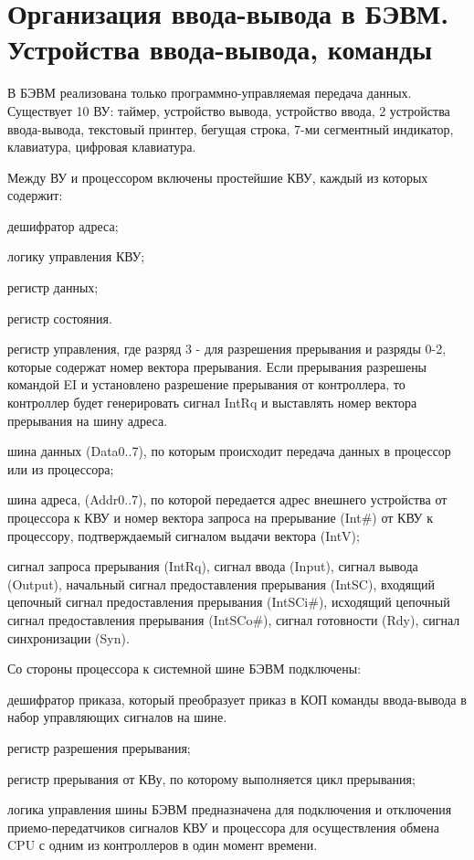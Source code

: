 \documentclass{article}
\begin{document}
\section{Организация ввода-вывода в БЭВМ. Устройства ввода-вывода, команды}
В БЭВМ реализована только программно-управляемая передача данных. 
Существует 10 ВУ: таймер, устройство вывода, устройство ввода, 2 устройства ввода-вывода, текстовый принтер, бегущая строка, 
7-ми сегментный индикатор, клавиатура, цифровая клавиатура.


Между ВУ и процессором включены простейшие КВУ, каждый из которых содержит: 


дешифратор адреса;


логику управления КВУ;


регистр данных;


регистр состояния.


регистр управления, где разряд 3 - для разрешения прерывания и разряды 0-2, которые содержат номер вектора прерывания. 
Если прерывания разрешены командой EI и установлено разрешение прерывания от контроллера, то контроллер будет генерировать сигнал IntRq 
и выставлять номер вектора прерывания на шину адреса.


шина данных (Data0..7), по которым происходит передача данных в процессор или из процессора;


шина адреса, (Addr0..7), по которой передается адрес внешнего устройства от процессора к КВУ и номер вектора запроса на прерывание (Int\#) от КВУ к процессору,
 подтверждаемый сигналом выдачи вектора (IntV);


сигнал запроса прерывания (IntRq), сигнал ввода (Input), сигнал вывода (Output), начальный сигнал предоставления прерывания (IntSC), входящий цепочный сигнал предоставления прерывания (IntSCi\#), исходящий цепочный сигнал предоставления прерывания (IntSCo\#), сигнал готовности (Rdy), сигнал синхронизации (Syn).



Со стороны процессора к системной шине БЭВМ подключены:


дешифратор приказа, который преобразует приказ в КОП команды ввода-вывода в набор управляющих сигналов на шине.


регистр разрешения прерывания; 


регистр прерывания от КВу, по которому выполняется цикл прерывания;


логика управления шины БЭВМ предназначена для подключения и отключения приемо-передатчиков сигналов КВУ и процессора для осуществления обмена CPU с одним из контроллеров в один момент времени.
\end{document}
